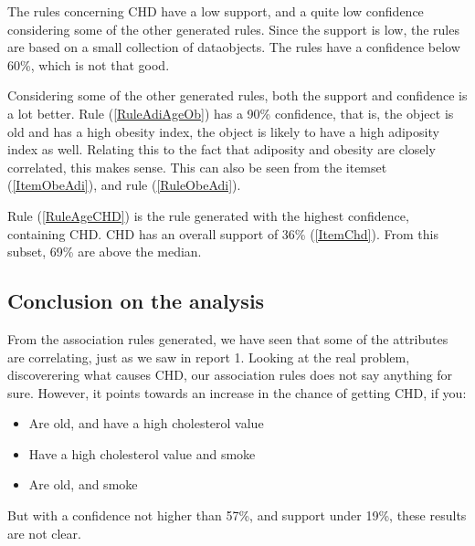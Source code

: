 The rules concerning CHD have a low support, and a quite low confidence considering some of the other generated rules. Since the support is low, the rules are based on a small collection of dataobjects. The rules have a confidence below 60\%, which is not that good.

Considering some of the other generated rules, both the support and confidence is a lot better. Rule (\ref{RuleAdiAgeOb}) has a 90\% confidence, that is, the object is old and has a high obesity index, the object is likely to have a high adiposity index as well. Relating this to the fact that adiposity and obesity are closely correlated, this makes sense. This can also be seen from the itemset (\ref{ItemObeAdi}), and rule (\ref{RuleObeAdi}).

Rule (\ref{RuleAgeCHD}) is the rule generated with the highest confidence, containing CHD. CHD has an overall support of 36\% (\ref{ItemChd}). From this subset, 69\% are above the median.

\subsection{Conclusion on the analysis}
From the association rules generated, we have seen that some of the attributes are correlating, just as we saw in report 1. Looking at the real problem, discoverering what causes CHD, our association rules does not say anything for sure. However, it points towards an increase in the chance of getting CHD, if you:
\begin{itemize}
\item Are old, and have a high cholesterol value
\item Have a high cholesterol value and smoke
\item Are old, and smoke
\end{itemize}
But with a confidence not higher than 57\%, and support under 19\%, these results are not clear.